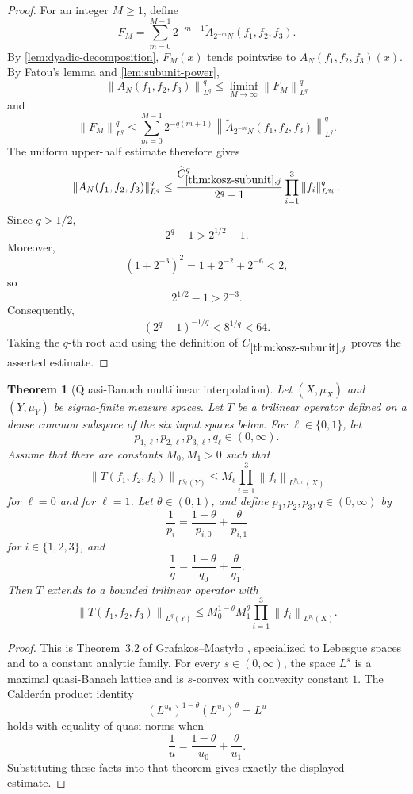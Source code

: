 \documentclass[11pt]{article}
\newtheorem{theorem}{Theorem}[section]
\newcommand{\norm}[2]{\left\lVert #1\right\rVert_{#2}}
\newcommand{\Cst}[2]{C_{\ref{#1},#2}}
\newcommand{\indices}{\{1,2,3\}}
\begin{document}
\begin{proof}
		For an integer \(M\geq1\), define
		\[
		F_M
		=
		\sum_{m=0}^{M-1}2^{-m-1}\widetilde A_{2^{-m}N}(f_1,f_2,f_3).
		\]
		By \cref{lem:dyadic-decomposition}, \(F_M(x)\) tends pointwise to \(A_N(f_1,f_2,f_3)(x)\).  By Fatou's lemma and \cref{lem:subunit-power},
		\[
		\norm{A_N(f_1,f_2,f_3)}{L^q}^{q}
		\leq
		\liminf_{M\to\infty}
		\norm{F_M}{L^q}^{q}
		\]
		and
		\[
		\norm{F_M}{L^q}^{q}
		\leq
		\sum_{m=0}^{M-1}2^{-q(m+1)}
		\norm{\widetilde A_{2^{-m}N}(f_1,f_2,f_3)}{L^q}^{q}.
		\]
		The uniform upper-half estimate therefore gives
		\[
		\norm{A_N(f_1,f_2,f_3)}{L^q}^{q}
		\leq
		\frac{\widetilde C_{\ref{thm:kosz-subunit},j}^{q}}{2^q-1}
		\prod_{i=1}^{3}\norm{f_i}{L^{q_i}}^{q}.
		\]
		Since \(q>1/2\),
		\[
		2^q-1>2^{1/2}-1.
		\]
		Moreover,
		\[
		(1+2^{-3})^2=1+2^{-2}+2^{-6}<2,
		\]
		so
		\[
		2^{1/2}-1>2^{-3}.
		\]
		Consequently,
		\[
		(2^q-1)^{-1/q}<8^{1/q}<64.
		\]
		Taking the \(q\)-th root and using the definition of \(\Cst{thm:kosz-subunit}{j}\) proves the asserted estimate.
	\end{proof}
	
	\begin{theorem}[Quasi-Banach multilinear interpolation]\label{thm:quasi-interpolation}
		Let \((X,\mu_X)\) and \((Y,\mu_Y)\) be sigma-finite measure spaces.  Let \(T\) be a trilinear operator defined on a dense common subspace of the six input spaces below.  For \(\ell\in\{0,1\}\), let
		\[
		p_{1,\ell},p_{2,\ell},p_{3,\ell},q_\ell\in(0,\infty).
		\]
		Assume that there are constants \(M_0,M_1>0\) such that
		\[
		\norm{T(f_1,f_2,f_3)}{L^{q_\ell}(Y)}
		\leq
		M_\ell\prod_{i=1}^{3}\norm{f_i}{L^{p_{i,\ell}}(X)}
		\]
		for \(\ell=0\) and for \(\ell=1\).  Let \(\theta\in(0,1)\), and define \(p_1,p_2,p_3,q\in(0,\infty)\) by
		\[
		\frac1{p_i}=\frac{1-\theta}{p_{i,0}}+\frac\theta{p_{i,1}}
		\]
		for \(i\in\indices\), and
		\[
		\frac1q=\frac{1-\theta}{q_0}+\frac\theta{q_1}.
		\]
		Then \(T\) extends to a bounded trilinear operator with
		\[
		\norm{T(f_1,f_2,f_3)}{L^q(Y)}
		\leq
		M_0^{1-\theta}M_1^\theta
		\prod_{i=1}^{3}\norm{f_i}{L^{p_i}(X)}.
		\]
	\end{theorem}
	
	\begin{proof}
		This is Theorem~3.2 of Grafakos--Masty\l o \cite[Theorem~3.2]{GrafakosMastylo}, specialized to Lebesgue spaces and to a constant analytic family.  For every \(s\in(0,\infty)\), the space \(L^s\) is a maximal quasi-Banach lattice and is \(s\)-convex with convexity constant \(1\).  The Calder\'on product identity
		\[
		(L^{u_0})^{1-\theta}(L^{u_1})^\theta=L^u
		\]
		holds with equality of quasi-norms when
		\[
		\frac1u=\frac{1-\theta}{u_0}+\frac\theta{u_1}.
		\]
		Substituting these facts into that theorem gives exactly the displayed estimate.
	\end{proof}
	
\end{document}
